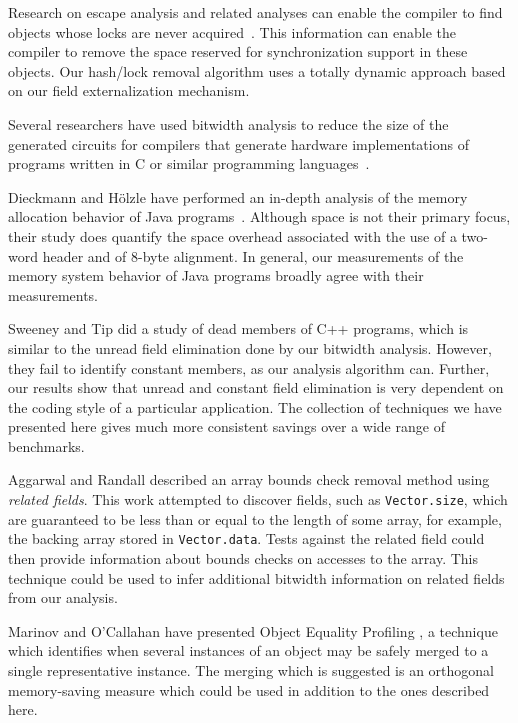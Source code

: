 \documentclass{sig-alt-full}
\begin{document}
Research on escape analysis and related analyses can enable the
compiler to find objects whose locks are never 
acquired~\cite{ACSE99,BH99,whaley99,CGSSM99,Ruf00:PLDI00,salcianu01}.
This information can enable the compiler to remove the space
reserved for synchronization support in these objects. 
Our hash/lock removal algorithm uses a totally dynamic approach
based on our field externalization mechanism. 

Several researchers have used bitwidth analysis to reduce the size
of the generated circuits for compilers that generate hardware
implementations of programs written in C or similar programming 
languages~\cite{ananian:siliconc,ananian99:tech,RR00:PLDI00,stephenson00,BGSW00}.

Dieckmann and H\"olzle have performed an in-depth analysis of the
memory allocation behavior of Java programs~\cite{DH99}. Although 
space is not their primary focus, their study does quantify 
the space overhead associated with the use of a two-word header
and of 8-byte alignment. In general, our measurements of the 
memory system behavior of Java programs broadly agree with their
measurements. 

Sweeney and Tip \cite{SweeneyTip98DeadDataMembers} did a study of dead
members of C++ programs, which is similar to the unread field
elimination done by our bitwidth analysis.  However, they
fail to identify constant members, as our analysis algorithm
can.  Further, our results show that unread and constant field
elimination is very dependent on the coding style of a particular
application.  The collection of techniques we have presented here
gives much more consistent savings over a wide range of benchmarks.

Aggarwal and Randall \cite{aggarwal01} described an array bounds check
removal method using {\it related fields}.  This work attempted to
discover fields, such as {\tt Vector.size}, which are guaranteed to be
less than or equal to the length of some array, for example, the
backing array stored in {\tt Vector.data}.  Tests against the related
field could then provide information about bounds checks on accesses
to the array.  This technique could be used to infer additional
bitwidth information on related fields from our analysis.

Marinov and O'Callahan have presented Object Equality Profiling
\cite{marinov03}, a technique which identifies when several instances
of an object may be safely merged to a single representative instance.
The merging which is suggested is an orthogonal memory-saving
measure which could be used in addition to the ones described here.
\end{document}
